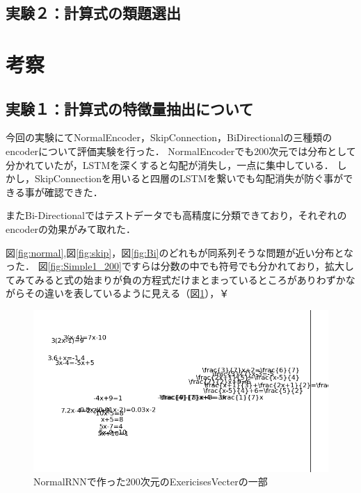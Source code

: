 \documentclass[a4j,11pt,report]{jsbook}
\begin{document}
\clearpage

\subsection{実験２：計算式の類題選出}


\begin{multicols}{2}
\end{multicols}

\section{考察}

\subsection{実験１：計算式の特徴量抽出について}
今回の実験にてNormalEncoder，SkipConnection，BiDirectionalの三種類のencoderについて評価実験を行った．
NormalEncoderでも200次元では分布として分かれていたが，LSTMを深くすると勾配が消失し，一点に集中している．
しかし，SkipConnectionを用いると四層のLSTMを繋いでも勾配消失が防ぐ事ができる事が確認できた．

またBi-Directionalではテストデータでも高精度に分類できており，それぞれのencoderの効果がみて取れた．

図\ref{fig:normal},図\ref{fig:skip}，図\ref{fig:Bi}のどれもが同系列そうな問題が近い分布となった．
図\ref{fig:Simple1_200}ですらは分数の中でも符号でも分かれており，拡大してみてみると式の始まりが負の方程式だけまとまっているところがありわずかながらその違いを表しているように見える（図\ref{fig:normal200cut}），￥

\begin{center}
  \begin{figure}[H]
    \centering
    \includegraphics[width=\linewidth]{image/detial/pca_formula_EV_final_22x200_1_cut.png}
    \caption{NormalRNNで作った200次元のExericisesVecterの一部}
    \label{fig:normal200cut}
  \end{figure}
\end{center}
\end{document}
